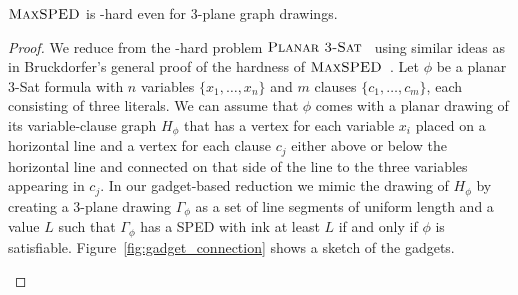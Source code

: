 \documentclass[a4paper,english,numberwithinsect]{eurocg18}
\newcommand{\maxsped}{\ensuremath{\textsc{MaxSPED}}\xspace}
\newcommand{\ppsat}{\ensuremath{\textsc{Planar 3-Sat}}\xspace}
\begin{document}
\begin{theorem}\label{thm:hard}
	\maxsped is \NP-hard even for 3-plane graph drawings.
\end{theorem}

\begin{proof}
	We reduce from the \NP-hard problem \ppsat~\cite{l-pftu-82} using similar ideas as in Bruckdorfer's general proof of the hardness of \maxsped~\cite{b-sgh-15}. %
	Let $\phi$ be a planar 3-Sat formula with $n$ variables $\{x_1, \dots, x_n\}$ and $m$ clauses $\{c_1, \dots, c_m\}$, each consisting of three literals.
	We can assume that $\phi$ comes with a planar drawing of its variable-clause graph $H_\phi$ that has a vertex for each variable $x_i$ placed on a horizontal line and a vertex for each clause $c_j$ either above or below the horizontal line and connected on that side of the line to the three variables appearing in $c_j$. 
	In our gadget-based reduction we mimic the drawing of $H_\phi$ by creating a 3-plane drawing $\Gamma_\phi$ as a set of line segments of uniform length and a value $L$ such that $\Gamma_\phi$ has a SPED with ink at least $L$ if and only if $\phi$ is satisfiable.
	Figure~\ref{fig:gadget_connection} shows a sketch of the gadgets.

		\begin{figure}


\end{figure}
\end{proof}
\end{document}
